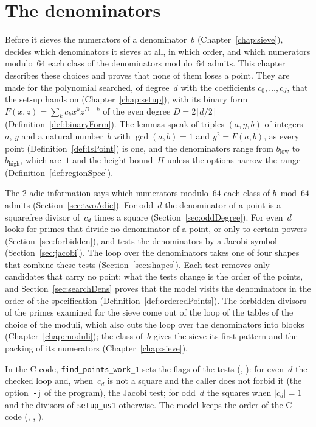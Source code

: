 \chapter{The denominators}\label{chap:denominators}

Before it sieves the numerators of a denominator~$b$ (Chapter~\ref{chap:sieve}), \ratpoints{} decides
which denominators it sieves at all, in which order, and which numerators modulo~$64$ each class of
the denominators modulo~$64$ admits. This chapter describes these choices and proves that none of
them loses a point. They are made for the polynomial searched, of degree~$d$ with the coefficients
$c_0, \dots, c_d$, that the set-up hands on (Chapter~\ref{chap:setup}), with its binary form
$F(x, z) = \sum_k c_k x^k z^{D - k}$ of the even degree $D = 2 \lceil d/2 \rceil$
(Definition~\ref{def:binaryForm}). The lemmas speak of triples $(a, y, b)$ of integers~$a$, $y$
and a natural number~$b$ with $\gcd(a, b) = 1$ and $y^2 = F(a, b)$, as every point
(Definition~\ref{def:IsPoint}) is one, and the denominators range from $b_{\mathrm{low}}$ to
$b_{\mathrm{high}}$, which are~$1$ and the height bound~$H$ unless the options narrow the range
(Definition~\ref{def:regionSpec}).

The 2-adic information says which numerators modulo~$64$ each class of $b \bmod 64$ admits
(Section~\ref{sec:twoAdic}). For odd~$d$ the denominator of a point is a squarefree divisor
of~$c_d$ times a square (Section~\ref{sec:oddDegree}). For even~$d$ \ratpoints{} looks for primes that
divide no denominator of a point, or only to certain powers (Section~\ref{sec:forbidden}), and tests
the denominators by a Jacobi symbol (Section~\ref{sec:jacobi}). The loop over the denominators takes
one of four shapes that combine these tests (Section~\ref{sec:shapes}). Each test removes only
candidates that carry no point; what the tests change is the order of the points, and
Section~\ref{sec:searchDens} proves that the model visits the denominators in the order of the
specification (Definition~\ref{def:orderedPoints}). The forbidden divisors of the primes examined
for the sieve come out of the loop of the tables of the choice of the moduli, which also cuts the
loop over the denominators into blocks (Chapter~\ref{chap:moduli}); the class of~$b$ gives the sieve
its first pattern and the packing of its numerators (Chapter~\ref{chap:sieve}).

In the C code, \verb|find_points_work_1| sets the flags of the tests
(, ): for even~$d$ the
checked loop and, when~$c_d$ is not a square and the caller does not forbid it (the
option~\verb|-j| of the program), the Jacobi test; for odd~$d$ the squares when $|c_d| = 1$ and the
divisors of \verb|setup_us1| otherwise. The model keeps the order of the C code
(, , ).

